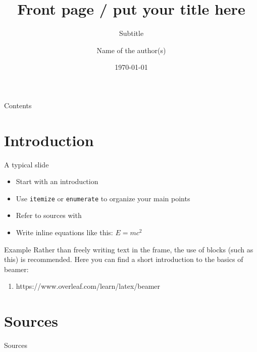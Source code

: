 \documentclass[aspectratio=169]{beamer}
\title[Your Short Title]{Front page / put your title here}
\subtitle{Subtitle}
\author{Name of the author(s)}
\date{\today}
\begin{document}
	\maketitle
	\begin{frame}{Contents}
		\tableofcontents
	\end{frame}

	\section{Introduction}
	\begin{frame}{A typical slide}
		\begin{itemize}
			\item Start with an introduction
			\item Use \texttt{itemize} or \texttt{enumerate} to organize your main points
			\item Refer to sources with~\cite{TeX-book}
			\item Write inline equations like this: $E = mc^2$
		\end{itemize}
		\begin{block}{Example}
			Rather than freely writing text in the frame, the use of blocks (such as this) is recommended.
			Here you can find a short introduction to the basics of beamer:
			\begin{enumerate}
				\item https://www.overleaf.com/learn/latex/beamer
			\end{enumerate}
		\end{block}
	\end{frame}
	
	\section{Sources}
	\begin{frame}[allowframebreaks]{Sources}
		\printbibliography
	\end{frame}
	
\end{document}
